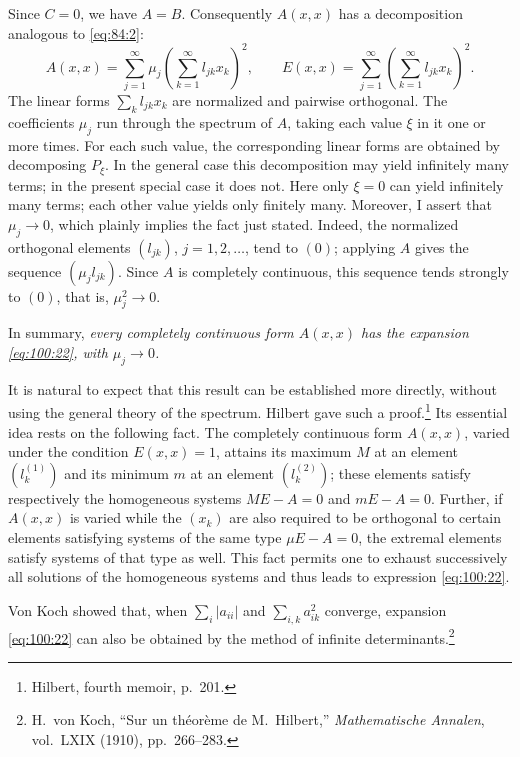 \documentclass[
  paper=b5,
  fontsize=13pt,
  twoside=true,
  open=any,
  bookmarkpackage=false,
  chapterprefix=true,
  headings=normal
]{scrbook}
\theoremstyle{definition}
\begin{document}
Since \(C=0\), we have \(A=B\).  Consequently \(A(x,x)\) has a decomposition
analogous to \eqref{eq:84:2}:
\begin{equation}
  A(x,x)=\sum_{j=1}^{\infty}\mu_j
  \left(\sum_{k=1}^{\infty}l_{jk}x_k\right)^2,
  \qquad
  E(x,x)=\sum_{j=1}^{\infty}
  \left(\sum_{k=1}^{\infty}l_{jk}x_k\right)^2.
  \tag{22}\label{eq:100:22}
\end{equation}
The linear forms \(\sum_k l_{jk}x_k\) are normalized and pairwise orthogonal.
The coefficients \(\mu_j\) run through the spectrum of \(A\), taking each
value \(\xi\) in it one or more times.  For each such value, the corresponding
linear forms are obtained by decomposing \(P_\xi\).  In the general case this
decomposition may yield infinitely many terms; in the present special case it
does not.  Here only \(\xi=0\) can yield infinitely many terms; each other
value yields only finitely many.  Moreover, I assert that \(\mu_j\to0\), which
plainly implies the fact just stated.  Indeed, the normalized orthogonal
elements \((l_{jk})\), \(j=1,2,\ldots\), tend to \((0)\); applying \(A\) gives
the sequence \((\mu_jl_{jk})\).  Since \(A\) is completely continuous, this
sequence tends strongly to \((0)\), that is, \(\mu_j^2\to0\).

In summary, \emph{every completely continuous form \(A(x,x)\) has the
expansion \eqref{eq:100:22}, with \(\mu_j\to0\).}

It is natural to expect that this result can be established more directly,
without using the general theory of the spectrum.  Hilbert gave such a
proof.\footnote{Hilbert, fourth memoir, p.~201.}  Its essential idea rests on
the following fact.  The completely continuous form \(A(x,x)\), varied under
the condition \(E(x,x)=1\), attains its maximum \(M\) at an element
\((l_k^{(1)})\) and its minimum \(m\) at an element \((l_k^{(2)})\); these
elements satisfy respectively the homogeneous systems \(ME-A=0\) and
\(mE-A=0\).  Further, if \(A(x,x)\) is varied while the \((x_k)\) are also
required to be orthogonal to certain
elements satisfying systems of the same type \(\mu E-A=0\), the extremal
elements satisfy systems of that type as well.  This fact permits one to
exhaust successively all solutions of the homogeneous systems and thus leads
to expression \eqref{eq:100:22}.

Von Koch showed that, when
\(\sum_i|a_{ii}|\) and \(\sum_{i,k}a_{ik}^2\) converge, expansion
\eqref{eq:100:22} can also be obtained by the method of infinite
determinants.\footnote{H.~von Koch, ``Sur un théorème de M.~Hilbert,''
\emph{Mathematische Annalen}, vol.~LXIX (1910), pp.~266--283.}
\end{document}
